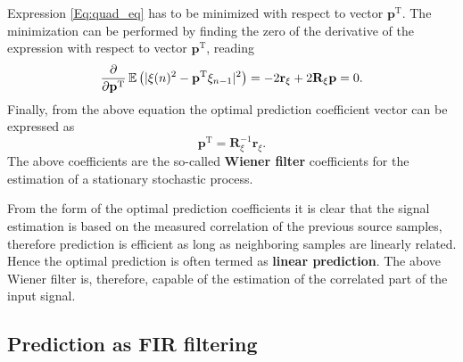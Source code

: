 Expression \ref{Eq:quad_eq} has to be minimized with respect to vector $\mathbf{p}^{\mathrm{T}}$.
The minimization can be performed by finding the zero of the derivative of the expression with respect to vector $\mathbf{p}^{\mathrm{T}}$, reading 
\begin{equation}
\frac{\partial}{\partial \mathbf{p}^{\mathrm{T}}}\operatorname{\mathbb{E}}\left( | \xi(n)^2 - \mathbf{p}^{\mathrm{T}} \mathbf{\xi}_{n-1} |^2 \right) =
- 2  \mathbf{r}_{\xi}  + 2\mathbf{R}_\xi \mathbf{p} = 0.
\end{equation}
Finally, from the above equation the optimal prediction coefficient vector can be expressed as
\begin{equation}
\mathbf{p}^{\mathrm{T}} =
\mathbf{R}_\xi^{-1} \mathbf{r}_{\xi}.
\label{Eq:optimal_coefs}
\end{equation}
The above coefficients are the so-called \textbf{Wiener filter} coefficients for the estimation of a stationary stochastic process.

From the form of the optimal prediction coefficients it is clear that the signal estimation is based on the measured correlation of the previous source samples, therefore prediction is efficient as long as neighboring samples are linearly related.
Hence the optimal prediction is often termed as \textbf{linear prediction}.
The above Wiener filter is, therefore, capable of the estimation of the correlated part of the input signal.

\subsection{Prediction as FIR filtering}


